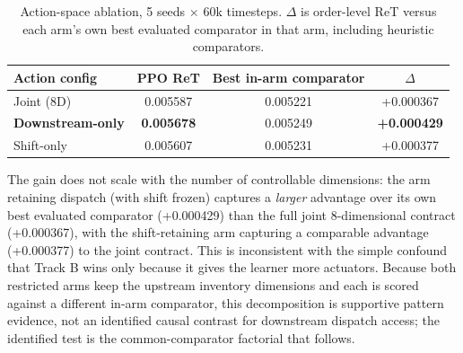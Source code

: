 \begin{table}[htbp]
\centering
\caption{Action-space ablation, 5 seeds $\times$ 60k timesteps. $\Delta$ is order-level ReT versus each arm's own best evaluated comparator in that arm, including heuristic comparators.}
\label{tab:ablation}
\small
\begin{tabular}{lccc}
\toprule
Action config & PPO ReT & Best in-arm comparator & $\Delta$ \\
\midrule
Joint (8D) & 0.005587 & 0.005221 & +0.000367 \\
\textbf{Downstream-only} & \textbf{0.005678} & 0.005249 & \textbf{+0.000429} \\
Shift-only & 0.005607 & 0.005231 & +0.000377 \\
\bottomrule
\end{tabular}
\end{table}

The gain does not scale with the number of controllable dimensions: the
arm retaining dispatch (with shift frozen) captures a \emph{larger}
advantage over its own best
evaluated comparator (+0.000429) than the full joint 8-dimensional contract
(+0.000367), with the shift-retaining arm capturing a comparable advantage
(+0.000377) to the joint contract. This is inconsistent with the simple
confound that Track B wins only because it gives the learner more
actuators. Because both restricted arms keep the upstream inventory
dimensions and each is scored against a different in-arm comparator,
this decomposition is supportive pattern evidence, not an identified
causal contrast for downstream dispatch access; the identified test is
the common-comparator factorial that follows.

